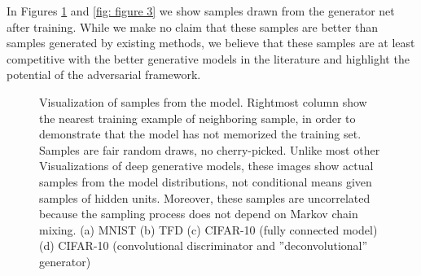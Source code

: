 In Figures \ref{fig: figure 2} and \ref{fig: figure 3} we show samples drawn from the generator net after training. While we make no claim that these samples are better than samples generated by existing methods, we believe that these samples are at least competitive with the better generative models in the literature and highlight the potential of the adversarial framework.

\begin{figure}[htb]
	\centering
	\caption{Visualization of samples from the model. Rightmost column show the nearest training example of neighboring sample, in order to demonstrate that the model has not memorized the training set. Samples are fair random draws, no cherry-picked. Unlike most other Visualizations of deep generative models, these images show actual samples from the model distributions, not conditional means given samples of hidden units. Moreover, these samples are uncorrelated because the sampling process does not depend on Markov chain mixing. (a) MNIST (b) TFD (c) CIFAR-10 (fully connected model) (d) CIFAR-10 (convolutional discriminator and ''deconvolutional'' generator)}
	\label{fig: figure 2}
\end{figure}

